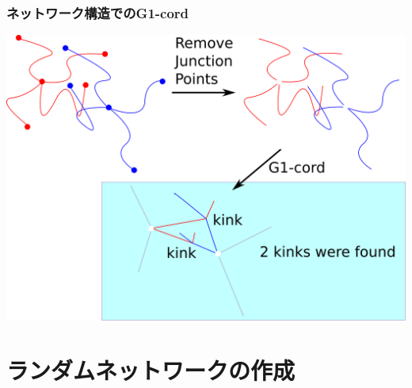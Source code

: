\documentclass[12pt, dvipdfmx]{beamer}
\begin{document}
\begin{frame}
	\frametitle{ネットワーク構造でのG1-cord}
		\begin{center}
			\includegraphics[width=.8\textwidth]{g1cord.png}
		\end{center}
\end{frame}

\section{ランダムネットワークの作成}
\end{document}
